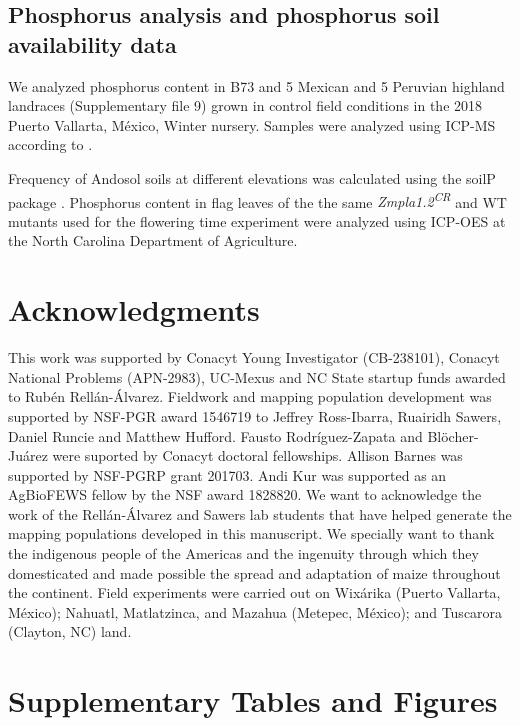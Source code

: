 \documentclass[9pt,twocolumn,twoside,lineno]{BioRxiv}
\begin{document}
\subsection{Phosphorus analysis and phosphorus soil availability data}
We analyzed phosphorus content in B73 and 5 Mexican  and 5 Peruvian highland landraces (Supplementary file 9) grown in control field conditions in the 2018 Puerto Vallarta, M\'exico, Winter nursery. 
Samples were analyzed using ICP-MS according to \cite{Baxter2014-ch}. 

Frequency of Andosol soils at different elevations was calculated using the soilP package \cite{Rodriguez-Zapata2018-vz}. %
Phosphorus content in flag leaves of the the same \textit{Zmpla1.2\textsuperscript{CR}} and WT mutants used for the flowering time experiment were analyzed using ICP-OES at the North Carolina Department of Agriculture.   %

\section{Acknowledgments}
This work was supported by Conacyt Young Investigator (CB-238101), Conacyt National Problems (APN-2983), UC-Mexus and NC State startup funds awarded to Rubén Rellán-Álvarez. 
Fieldwork and mapping population development was supported by NSF-PGR award 1546719 to Jeffrey Ross-Ibarra, Ruairidh Sawers, Daniel Runcie and Matthew Hufford.  
Fausto Rodríguez-Zapata and Blöcher-Juárez were suported by Conacyt doctoral fellowships.
Allison Barnes was supported by NSF-PGRP grant 201703. 
Andi Kur was supported as an AgBioFEWS fellow by the NSF award 1828820.
We want to acknowledge the work of the Rellán-Álvarez and Sawers lab students that have helped generate the mapping populations developed in this manuscript.
We specially want to thank the indigenous people of the Americas and the  ingenuity through which they domesticated and made possible the spread and adaptation of maize throughout the continent. 
Field experiments were carried out on Wixárika (Puerto Vallarta, México); Nahuatl, Matlatzinca, and Mazahua (Metepec, México); and Tuscarora (Clayton, NC) land.
\label{sec:acknowledgments}



\clearpage

\onecolumn

\section*{Supplementary Tables and Figures}
\end{document}
